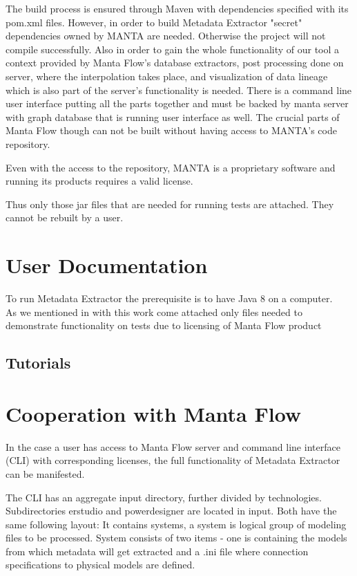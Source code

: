 \documentclass[12pt,a4paper]{report}
\begin{document}
The build process is ensured through Maven with dependencies specified with its pom.xml files.
However, in order to build Metadata Extractor "secret" dependencies owned by MANTA are needed. Otherwise the project will not compile successfully. 
Also in order to gain the whole functionality of our tool a context provided by Manta Flow's database extractors, post processing done on server, where the interpolation takes place, and visualization of data lineage which is also part of the server's functionality is needed. 
There is a command line user interface putting all the parts together and must be backed by manta server with graph database that is running user interface as well. The crucial parts of Manta Flow though can not be built without having access to MANTA's code repository.

Even with the access to the repository, MANTA is a proprietary software and running its products requires a valid license.

Thus only those jar files that are needed for running tests are attached. They cannot be rebuilt by a user.


\section{User Documentation}

To run Metadata Extractor the prerequisite is to have Java 8 on a computer. \\

As we mentioned in  with this work come attached only files needed to demonstrate functionality on tests due to licensing of Manta Flow product

\subsection{Tutorials}


\section{Cooperation with Manta Flow}

In the case a user has access to Manta Flow server and command line interface (CLI) with corresponding licenses, the full functionality of Metadata Extractor can be manifested.

The CLI has an aggregate input directory, further divided by technologies.
Subdirectories erstudio and powerdesigner are located in input.  
Both have the same following layout: 
It contains systems, a system is logical group of modeling files to be processed.
System consists of two items - one is containing the models from which metadata will get extracted and a .ini file where connection specifications to physical models are defined.
\end{document}
